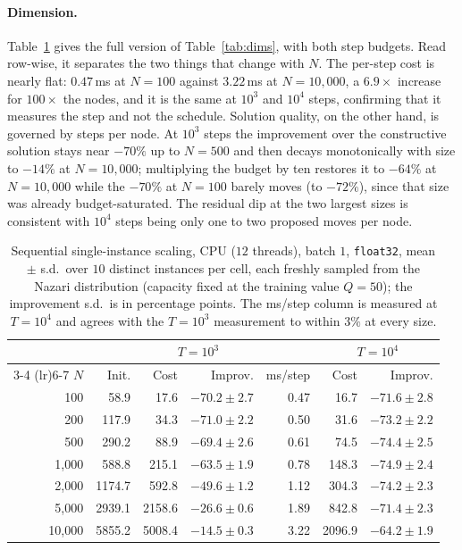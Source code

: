 \documentclass[letterpaper]{article} %
\begin{document}
\paragraph{Dimension.}
Table~\ref{tab:dimsfull} gives the full version of Table~\ref{tab:dims}, with both step budgets. Read row-wise, it separates the two things that change with $N$. The per-step cost is nearly flat: $0.47$\,ms at $N = 100$ against $3.22$\,ms at $N = 10{,}000$, a $6.9\times$ increase for $100\times$ the nodes, and it is the same at $10^{3}$ and $10^{4}$ steps, confirming that it measures the step and not the schedule. Solution quality, on the other hand, is governed by steps per node. At $10^{3}$ steps the improvement over the constructive solution stays near $-70\%$ up to $N = 500$ and then decays monotonically with size to $-14\%$ at $N = 10{,}000$; multiplying the budget by ten restores it to $-64\%$ at $N = 10{,}000$ while the $-70\%$ at $N = 100$ barely moves (to $-72\%$), since that size was already budget-saturated. The residual dip at the two largest sizes is consistent with $10^{4}$ steps being only one to two proposed moves per node.

\begin{table}[t]
\centering
\small
\setlength{\tabcolsep}{4pt}
\begin{tabular}{@{}r r rr r rr@{}}
\toprule
& & \multicolumn{2}{c}{$T = 10^{3}$} & & \multicolumn{2}{c}{$T = 10^{4}$} \\
\cmidrule(lr){3-4} \cmidrule(lr){6-7}
$N$ & Init. & Cost & Improv. & ms/step & Cost & Improv. \\
\midrule
100      & 58.9   & 17.6   & $-70.2 {\pm} 2.7$ & 0.47 & 16.7   & $-71.6 {\pm} 2.8$ \\
200      & 117.9  & 34.3   & $-71.0 {\pm} 2.2$ & 0.50 & 31.6   & $-73.2 {\pm} 2.2$ \\
500      & 290.2  & 88.9   & $-69.4 {\pm} 2.6$ & 0.61 & 74.5   & $-74.4 {\pm} 2.5$ \\
1{,}000  & 588.8  & 215.1  & $-63.5 {\pm} 1.9$ & 0.78 & 148.3  & $-74.9 {\pm} 2.4$ \\
2{,}000  & 1174.7 & 592.8  & $-49.6 {\pm} 1.2$ & 1.12 & 304.3  & $-74.2 {\pm} 2.3$ \\
5{,}000  & 2939.1 & 2158.6 & $-26.6 {\pm} 0.6$ & 1.89 & 842.8  & $-71.4 {\pm} 2.3$ \\
10{,}000 & 5855.2 & 5008.4 & $-14.5 {\pm} 0.3$ & 3.22 & 2096.9 & $-64.2 {\pm} 1.9$ \\
\bottomrule
\end{tabular}
\caption{Sequential single-instance scaling, CPU ($12$ threads), batch $1$, \texttt{float32}, mean $\pm$ s.d.\ over $10$ distinct instances per cell, each freshly sampled from the Nazari distribution (capacity fixed at the training value $Q = 50$); the improvement s.d.\ is in percentage points. The ms/step column is measured at $T = 10^{4}$ and agrees with the $T = 10^{3}$ measurement to within $3\%$ at every size.}
\label{tab:dimsfull}
\end{table}
\end{document}
